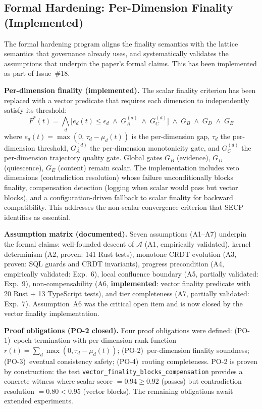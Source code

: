 \documentclass[11pt]{article}
\begin{document}
\subsection{Formal Hardening: Per-Dimension Finality (Implemented)}
\label{sec:formal-hardening}

The formal hardening program aligns the finality semantics with the lattice semantics that governance already uses, and systematically validates the assumptions that underpin the paper's formal claims. This has been implemented as part of Issue~\#18.

\textbf{Per-dimension finality (implemented).} The scalar finality criterion has been replaced with a vector predicate that requires each dimension to independently satisfy its threshold:
\[
F^*(t) = \bigwedge_d \bigl[e_d(t) \leq \epsilon_d \;\wedge\; G_A^{(d)} \;\wedge\; G_C^{(d)}\bigr] \;\wedge\; G_B \;\wedge\; G_D \;\wedge\; G_E
\]
where $e_d(t) = \max(0,\, \tau_d - \mu_d(t))$ is the per-dimension gap, $\tau_d$ the per-dimension threshold, $G_A^{(d)}$ the per-dimension monotonicity gate, and $G_C^{(d)}$ the per-dimension trajectory quality gate. Global gates $G_B$ (evidence), $G_D$ (quiescence), $G_E$ (content) remain scalar. The implementation includes veto dimensions (contradiction resolution) whose failure unconditionally blocks finality, compensation detection (logging when scalar would pass but vector blocks), and a configuration-driven fallback to scalar finality for backward compatibility. This addresses the non-scalar convergence criterion that SECP~\cite{delachica2026} identifies as essential.

\textbf{Assumption matrix (documented).} Seven assumptions (A1--A7) underpin the formal claims: well-founded descent of $\mathcal{A}$ (A1, empirically validated), kernel determinism (A2, proven: 141 Rust tests), monotone CRDT evolution (A3, proven: SQL guards and CRDT invariants), progress precondition (A4, empirically validated: Exp.~6), local confluence boundary (A5, partially validated: Exp.~9), non-compensability (A6, \textbf{implemented}: vector finality predicate with 20 Rust + 13 TypeScript tests), and tier completeness (A7, partially validated: Exp.~7). Assumption~A6 was the critical open item and is now closed by the vector finality implementation.

\textbf{Proof obligations (PO-2 closed).} Four proof obligations were defined: (PO-1)~epoch termination with per-dimension rank function $r(t) = \sum_d \max(0, \tau_d - \mu_d(t))$; (PO-2)~per-dimension finality soundness; (PO-3)~eventual consistency safety; (PO-4)~routing completeness. PO-2 is proven by construction: the test \texttt{vector\_finality\_blocks\_compensation} provides a concrete witness where scalar score $= 0.94 \geq 0.92$ (passes) but contradiction resolution $= 0.80 < 0.95$ (vector blocks). The remaining obligations await extended experiments.
\end{document}
